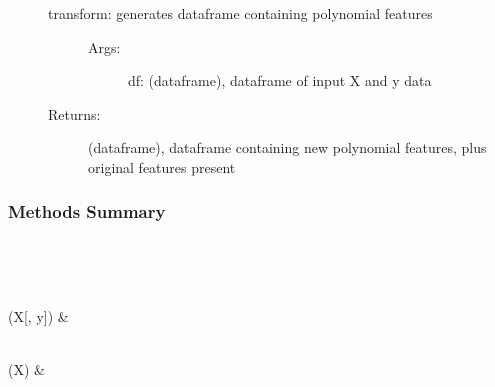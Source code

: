\documentclass[letterpaper,10pt,english]{sphinxmanual}
\begin{document}
\begin{fulllineitems}
\begin{description}
\begin{description}
\begin{description}
\end{description}

\item[{transform: generates dataframe containing polynomial features}] \leavevmode\begin{description}
\item[{Args:}] \leavevmode
df: (dataframe), dataframe of input X and y data

\end{description}

\item[{Returns:}] \leavevmode
(dataframe), dataframe containing new polynomial features, plus original features present

\end{description}

\end{description}
\subsubsection*{Methods Summary}


\begin{savenotes}\sphinxatlongtablestart\begin{longtable}[c]{}
\hline

\endfirsthead

%
{}\\
\hline

\endhead

\hline
{}\\
\endfoot

\endlastfoot

{\hyperref[\detokenize{api/mastml.feature_generators.PolynomialFeatureGenerator:mastml.feature_generators.PolynomialFeatureGenerator.fit}]{}}(X{[}, y{]})
&

\\
\hline
{\hyperref[\detokenize{api/mastml.feature_generators.PolynomialFeatureGenerator:mastml.feature_generators.PolynomialFeatureGenerator.transform}]{}}(X)
&

\\
\hline
\end{longtable}\sphinxatlongtableend\end{savenotes}

\end{fulllineitems}
\end{document}
